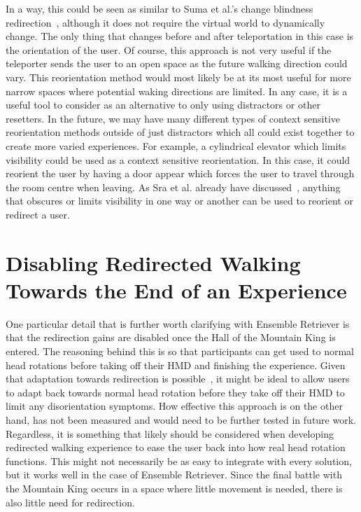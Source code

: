 In a way, this could be seen as similar to Suma et al.'s change blindness redirection~\cite{suma2011leveraging}, although it does not require the virtual world to dynamically change. The only thing that changes before and after teleportation in this case is the orientation of the user. Of course, this approach is not very useful if the teleporter sends the user to an open space as the future walking direction could vary. This reorientation method would most likely be at its most useful for more narrow spaces where potential waking directions are limited. In any case, it is a useful tool to consider as an alternative to only using distractors or other resetters. In the future, we may have many different types of context sensitive reorientation methods outside of just distractors which all could exist together to create more varied experiences. For example, a cylindrical elevator which limits visibility could be used as a context sensitive reorientation. In this case, it could reorient the user by having a door appear which forces the user to travel through the room centre when leaving. As Sra et al. already have discussed~\cite{sra2018vmotion}, anything that obscures or limits visibility in one way or another can be used to reorient or redirect a user. 


\section{Disabling Redirected Walking Towards the End of an Experience}

One particular detail that is further worth clarifying with Ensemble Retriever is that the redirection gains are disabled once the Hall of the Mountain King is entered. The reasoning behind this is so that participants can get used to normal head rotations before taking off their HMD and finishing the experience. Given that adaptation towards redirection is possible~\cite{bolling2019shrinking, grechkin2016revisiting}, it might be ideal to allow users to adapt back towards normal head rotation before they take off their HMD to limit any disorientation symptoms. How effective this approach is on the other hand, has not been measured and would need to be further tested in future work. Regardless, it is something that likely should be considered when developing redirected walking experience to ease the user back into how real head rotation functions. This might not necessarily be as easy to integrate with every solution, but it works well in the case of Ensemble Retriever. Since the final battle with the Mountain King occurs in a space where little movement is needed, there is also little need for redirection.

